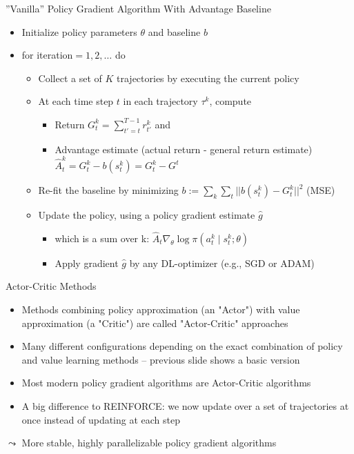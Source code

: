 \documentclass[aspectratio=169]{../latex_main/tntbeamer}  %
\begin{document}
\begin{frame}[c]{”Vanilla” Policy Gradient Algorithm With Advantage Baseline}
	
	\begin{itemize}
		\item Initialize policy parameters $\theta$ and baseline $b$
		\item for iteration$=1,2,\ldots$ do
		\begin{itemize}
			\item Collect a set of $K$ trajectories by executing the current policy
			\item At each time step $t$ in each trajectory $\tau^k$, compute
			\begin{itemize}
				\item Return $G_t^k= \sum_{t'=t}^{T-1} r_{t'}^k$ and
				\item Advantage estimate (actual return - general return estimate) $\hat{A}^k_t = G^k_t - b(s^k_t) = G^k_t - G^t$ 
			\end{itemize}
			\item Re-fit the baseline by minimizing $b := \sum_k \sum_t || b(s^k_t) - G^k_t||^2$ (MSE)
			\item Update the policy, using a policy gradient estimate $\hat{g}$
			\begin{itemize}
				\item which is a sum over k: $\hat{A}_t \nabla_\theta \log \pi(a^k_t \mid s^k_t; \theta) $
				\item Apply gradient $\hat{g}$ by any DL-optimizer (e.g., SGD or ADAM)
			\end{itemize}
		\end{itemize}
		
	\end{itemize}
 
\end{frame}

\begin{frame}[c]{Actor-Critic Methods}
	
	\begin{itemize}
		\item Methods combining policy approximation (an "Actor") with value approximation (a "Critic") are called "Actor-Critic" approaches
        \item Many different configurations depending on the exact combination of policy and value learning methods -- previous slide shows a basic version
        \item Most modern policy gradient algorithms are Actor-Critic algorithms
        \item A big difference to REINFORCE: we now update over a set of trajectories at once instead of updating at each step
	\end{itemize}
	\bigskip
 $\leadsto$ More stable, highly parallelizable policy gradient algorithms
\end{frame}

\end{document}
